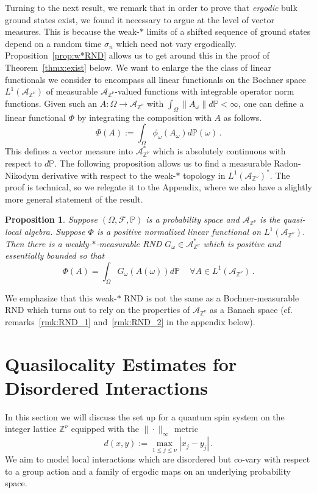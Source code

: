 \documentclass{article}
\newcommand{\Znu}{\mathbb{Z}^\nu}
\newcommand{\A}{\mathcal{A}}
\renewcommand{\P}{\mathbb{P}}
\newcommand{\<}{\langle}
\renewcommand{\>}{\rangle}
\newtheorem{prop}[thm]{Proposition}
\theoremstyle{definition}
\numberwithin{equation}{section}
\begin{document}
Turning to the next result, we remark that in order to prove that \emph{ergodic} bulk ground states exist, we found it necessary to argue at the level of vector measures. This is because the weak-$\ast$ limits of a shifted sequence of ground states depend on a random time $\sigma_n$ which need not vary ergodically. Proposition~\ref{prop:w*RND} allows us to get around this in the proof of Theorem~\ref{thmx:exist} below. We want to enlarge the the class of linear functionals we consider to encompass all linear functionals on the Bochner space $L^1(\A_{\Znu})$ of measurable $\A_{\Znu}$-valued functions with integrable operator norm functions. Given such an $A:\Omega \to \A_{\Znu}$ with $\int_\Omega \|A_\omega\| d\P <\infty$, one can define a linear functional $\Phi$ by integrating the composition with $A$ as follows. 
\[
    \Phi(A) := \int_\Omega \phi_\omega(A_\omega) d\P(\omega)\,.
\] This defines a vector measure into $\A_{\Znu}^*$ which is absolutely continuous with respect to $d\P$. The following proposition allows us to find a measurable Radon-Nikodym derivative with respect to the weak-$\ast$ topology in $L^1(\A_{\Znu})^*$. The proof is technical, so we relegate it to the Appendix, where we also have a slightly more general statement of the result.

\begin{prop}
	Suppose $(\Omega, \mathcal{F}, \P)$ is a probability space and $\A_{\Znu}$ is the quasi-local algebra. Suppose $\Phi$ is a positive normalized linear functional on $L^1(\A_{\Znu})$. Then there is a weakly-$\ast$-measurable RND $G_\omega\in \A_{\Znu}^*$ which is positive and essentially bounded so that
	\begin{equation}\label{eqn:w*RND}
		\Phi(A) = \int_\Omega G_\omega(A(\omega)) d\P\,\quad \forall A\in L^1(\A_{\Znu})\,.
	\end{equation} 
\end{prop} 

We emphasize that this weak-$\ast$ RND is not the same as a Bochner-measurable RND which turns out to rely on the properties of $\A_{\Znu}$ as a Banach space (cf. remarks~\ref{rmk:RND_1} and~\ref{rmk:RND_2} in the appendix below). 



\section{Quasilocality Estimates for Disordered Interactions}\label{sec:Quasilocality}
In this section we will discuss the set up for a quantum spin system on the integer lattice $\Znu$ equipped with the $\|\cdot \|_{\infty}$ metric 
\[
d(x,y):= \max_{1\le j \le \nu} |x_j - y_j|\,. 
\] We aim to model local interactions which are disordered but co-vary with respect to a group action and a family of ergodic maps on an underlying probability space. 
\end{document}
